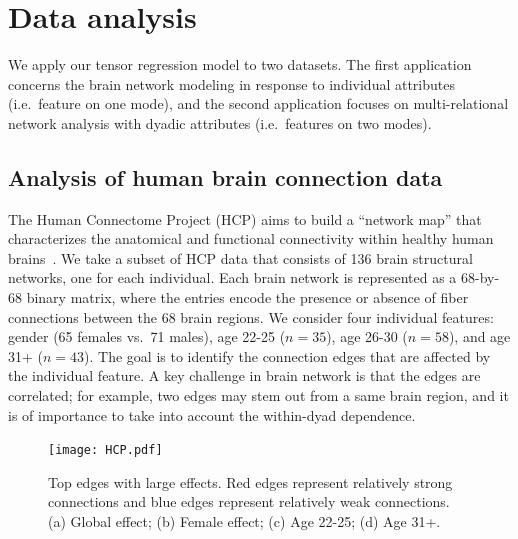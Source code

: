 \documentclass[12pt]{article}
\theoremstyle{plain}
\theoremstyle{definition}
\begin{document}
\section{Data analysis}\label{sec:data}
We apply our tensor regression model to two datasets. The first application concerns the brain network modeling in response to individual attributes (i.e.\ feature on one mode), and the second application focuses on multi-relational network analysis with dyadic attributes (i.e.\ features on two modes). 

\subsection{Analysis of human brain connection data}
The Human Connectome Project (HCP) aims to build a ``network map'' that characterizes the anatomical and functional connectivity within healthy human brains~\citep{HCP}. We take a subset of HCP data that consists of 136 brain structural networks, one for each individual. Each brain network is represented as a 68-by-68 binary matrix, where the entries encode the presence or absence of fiber connections between the 68 brain regions. We consider four individual features: gender (65 females vs.\ 71 males), age 22-25 ($n=35$), age 26-30 ($n=58$), and age 31+ ($n=43$). The goal is to identify the connection edges that are affected by the individual feature. A key challenge in brain network is that the edges are correlated; for example, two edges may stem out from a same brain region, and it is of importance to take into account the within-dyad dependence. 


\begin{figure}[H]
\centering
\texttt{[image: HCP.pdf]}
\caption{Top edges with large effects. Red edges represent relatively strong connections and blue edges represent relatively weak connections. (a) Global effect; (b) Female effect; (c) Age 22-25; (d) Age 31+.}\label{fig:brain}
\end{figure}
\end{document}
